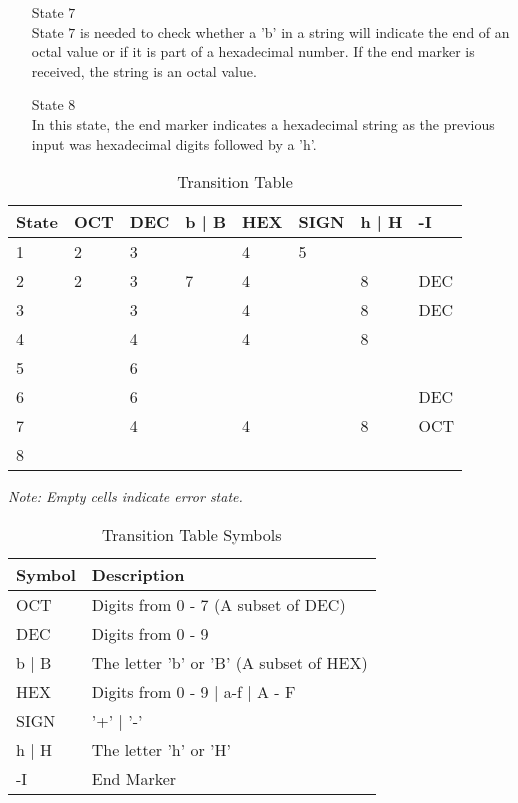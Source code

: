 \documentclass[11pt]{article}
\begin{document}
\begin{itemize}
\item[State $7$] \hfill \\
State $7$ is needed to check whether a 'b' in a string will indicate the end of an octal value or if it is part of a hexadecimal number. If the end marker is received, the string is an octal value.
\item[State $8$] \hfill \\
In this state, the end marker indicates a hexadecimal string as the previous input was hexadecimal digits followed by a 'h'.
\end{itemize}
\newpage

\begin{table}[h]
\centering
\begin{tabular}{|l|l|l|l|l|l|l|l|}
\hline
State & OCT & DEC & b | B & HEX & SIGN & h | H & -I  \\ \hline
1     & 2   & 3   &       & 4   & 5    &       &     \\ \hline
2     & 2   & 3   & 7     & 4   &      & 8     & DEC \\ \hline
3     &     & 3   &       & 4   &      & 8     & DEC \\ \hline
4     &     & 4   &       & 4   &      & 8     &     \\ \hline
5     &     & 6   &       &     &      &       &     \\ \hline
6     &     & 6   &       &     &      &       & DEC \\ \hline
7     &     & 4   &       & 4   &      & 8     & OCT \\ \hline
8     &     &     &       &     &      &       &     \\ \hline
\end{tabular}
\caption{Transition Table}
\label{Transition Table}
\end{table}

\begin{center}
\textit{Note: Empty cells indicate error state.}
\end{center}

\begin{table}[h]
\centering
\begin{tabular}{|l|l|}
\hline
Symbol & Description                         \\ \hline
OCT    & Digits from 0 - 7 (A subset of DEC) \\ \hline
DEC    & Digits from 0 - 9                   \\ \hline
b | B  & The letter 'b' or 'B' (A subset of HEX) \\ \hline
HEX    & Digits from 0 - 9 | a-f | A - F     \\ \hline
SIGN   & '+' | '-'                           \\ \hline
h | H  & The letter 'h' or 'H'               \\ \hline
-I     & End Marker                          \\ \hline
\end{tabular}
\caption{Transition Table Symbols}
\label{Transition Table Symbols}
\end{table}
\end{document}

